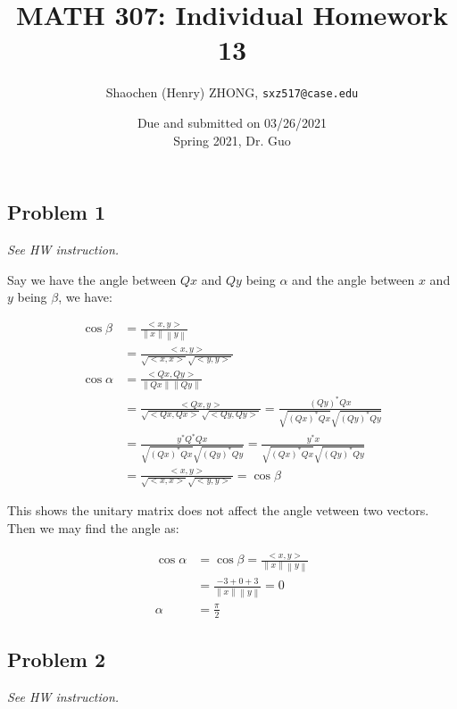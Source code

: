 \documentclass[11pt]{article}
\newcommand{\ilc}{\texttt}
\providecommand{\norm}[1]{\left\lVert #1 \right\rVert}
\begin{document}
\title{\textbf{MATH 307: Individual Homework 13}}


\author{Shaochen (Henry) ZHONG, \ilc{sxz517@case.edu}}

\date{Due and submitted on 03/26/2021 \\ Spring 2021, Dr. Guo}
\maketitle



\subsection*{Problem 1}
\textit{See HW instruction.}\newline

Say we have the angle between $Qx$ and $Qy$ being $\alpha$ and the angle between $x$ and $y$ being $\beta$, we have:

\begin{align*}
    \cos \beta &= \frac{<x, y>}{\norm{x} \norm{y}} \\
    &=\frac{<x, y>}{\sqrt{<x, x>} \sqrt{<y, y>}} \\
    \cos \alpha &= \frac{<Qx, Qy>}{\norm{Qx} \norm{Qy}} \\
    &=\frac{<Qx, y>}{\sqrt{<Qx, Qx>} \sqrt{<Qy, Qy>}} = \frac{(Qy)^* Qx}{\sqrt{(Qx)^* Qx}\sqrt{(Qy)^* Qy}} \\
    &= \frac{y^* Q^* Qx}{\sqrt{(Qx)^* Qx}\sqrt{(Qy)^* Qy}} = \frac{y^* x}{\sqrt{(Qx)^* Qx}\sqrt{(Qy)^* Qy}} \\
    &= \frac{<x, y>}{\sqrt{<x, x>} \sqrt{<y, y>}} = \cos \beta
\end{align*}

This shows the unitary matrix does not affect the angle vetween two vectors. Then we may find the angle as:

\begin{align*}
    \cos \alpha &= \cos \beta = \frac{<x, y>}{\norm{x} \norm{y}} \\
    &= \frac{-3 + 0 + 3}{\norm{x} \norm{y}} = 0 \\
    \alpha &= \frac{\pi}{2}
\end{align*}


\subsection*{Problem 2}
\textit{See HW instruction.}\newline
\end{document}
